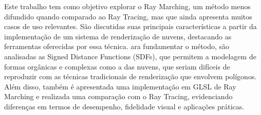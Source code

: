 Este trabalho tem como objetivo explorar o Ray Marching, um método menos difundido quando comparado ao Ray Tracing, mas que ainda apresenta muitos casos de uso relevantes. São discutidas suas principais características a partir da implementação de um sistema de renderização de nuvens, destacando as ferramentas oferecidas por essa técnica. ara fundamentar o método, são analisadas as Signed Distance Functions (SDFs), que permitem a modelagem de formas orgânicas e complexas como a das nuvens, que seriam difíceis de reproduzir com as técnicas tradicionais de renderização que envolvem polígonos. Além disso, também é apresentada uma implementação em GLSL de Ray Marching e realizada uma comparação com o Ray Tracing, evidenciando diferenças em termos de desempenho, fidelidade visual e aplicações práticas.